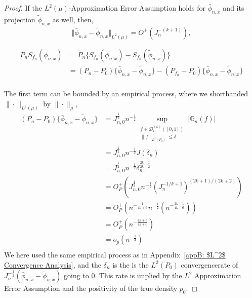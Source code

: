 \begin{proof}
If the $L^2(\mu)$-Approximation Error Assumption holds for $\bar{\phi}_{n,x}$ and its projection $\tilde{\phi}_{n,x}$ as well, then,  
\[
\Vert \bar{\phi}_{n,x} - \tilde{\phi}_{n,x} \Vert_{L^2(\mu)} = O^+(J_n^{-(k+1)}),
\]

\begin{align*}
P_n S_{f_n}(\bar{\phi}_{n,x}) &= P_n \{S_{f_n}(\bar{\phi}_{n,x})-S_{f_n}(\tilde{\phi}_{n,x})\} \\
&= (P_n - P_0) \{\bar{\phi}_{n,x}-\tilde{\phi}_{n,x}\} - (P_{f_n} - P_0) \{\bar{\phi}_{n,x}-\tilde{\phi}_{n,x}\} \\
\end{align*}    

The first term can be bounded by an empirical process, where we shorthanded $\|\cdot\|_{L^2(\mu)}$ by $\|\cdot\|_{\mu}$,
\begin{align*}
    (P_n - P_0) \{\bar{\phi}_{n,x}-\tilde{\phi}_{n,x}\} &= J_{n,0}^{\frac{1}{2}} n^{-\frac12} \sup_{\substack{f\in\mathcal D^{(k)}_U([0,1])\\ \lVert f\rVert_{L^{2}(P_{0})}\leq\delta}}
    \bigl\lvert \mathbb{G}_{n}(f) \bigr\rvert   \\
    &= J_{n,0}^{\frac{1}{2}} n^{-\frac12} J(\delta_n) \\
    &= J_{n,0}^{\frac{1}{2}} n^{-\frac12} \delta_n^{\frac{2k+1}{2k+2}} \\
    &= O_P^+(J_{n,0}^{\frac{1}{2}} n^{-\frac12} (J_n^{-1/k+1})^{(2k+1)/(2k+2)}) \\
    &= O_P^+(n^{-\frac{1}{4k+6}} n^{-\frac12} (n^{-\frac{2k+1}{4k+6}})) \\
    &= O_P^+(n^{-\frac{4k+5}{4k+6}}) \\
    &= o_p(n^{-\frac{1}{2}}) \\
\end{align*}
We here used the same empirical process as in Appendix~\ref{appB: $L^2$ Convergence Analysis}, and the $\delta_n$ is the is the $L^2(P_0)$ convergencerate of $J_n^{-\frac{1}{2}}(\bar{\phi}_{n,x}-\tilde{\phi}_{n,x})$ going to 0. This rate is implied by the $L^2$ Approximation Error Assumption and the positivity of the true density $p_{0}$.


\end{proof}
